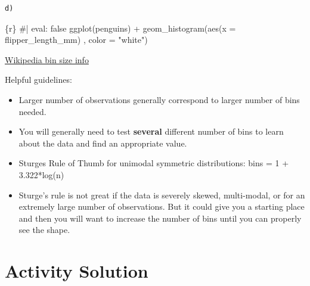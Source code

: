 \documentclass[
  letterpaper,
  DIV=11,
  numbers=noendperiod]{scrreprt}
\newenvironment{Shaded}{\begin{snugshade}}{\end{snugshade}}
\newcommand{\AttributeTok}[1]{\textcolor[rgb]{0.40,0.45,0.13}{#1}}
\newcommand{\CommentTok}[1]{\textcolor[rgb]{0.37,0.37,0.37}{#1}}
\newcommand{\FunctionTok}[1]{\textcolor[rgb]{0.28,0.35,0.67}{#1}}
\newcommand{\InformationTok}[1]{\textcolor[rgb]{0.37,0.37,0.37}{#1}}
\newcommand{\NormalTok}[1]{\textcolor[rgb]{0.00,0.23,0.31}{#1}}
\newcommand{\SpecialCharTok}[1]{\textcolor[rgb]{0.37,0.37,0.37}{#1}}
\newcommand{\StringTok}[1]{\textcolor[rgb]{0.13,0.47,0.30}{#1}}
\begin{document}
\begin{tcolorbox}[enhanced jigsaw, breakable, colback=white, bottomrule=.15mm, leftrule=.75mm, colframe=quarto-callout-note-color-frame, arc=.35mm, rightrule=.15mm, toprule=.15mm, left=2mm, opacityback=0]
\begin{verbatim}
d)  
\end{verbatim}

\begin{Shaded}
\begin{Highlighting}[]
\InformationTok{\textasciigrave{}\textasciigrave{}\textasciigrave{}\{r\}}
\CommentTok{\#| eval: false}
\FunctionTok{ggplot}\NormalTok{(penguins) }\SpecialCharTok{+}
  \FunctionTok{geom\_histogram}\NormalTok{(}\FunctionTok{aes}\NormalTok{(}\AttributeTok{x =}\NormalTok{ flipper\_length\_mm) , }\AttributeTok{color =} \StringTok{"white"}\NormalTok{)}
\InformationTok{\textasciigrave{}\textasciigrave{}\textasciigrave{}}
\end{Highlighting}
\end{Shaded}

\end{tcolorbox}

\begin{tcolorbox}[enhanced jigsaw, breakable, colback=white, bottomrule=.15mm, leftrule=.75mm, colframe=quarto-callout-note-color-frame, arc=.35mm, rightrule=.15mm, toprule=.15mm, left=2mm, opacityback=0]

\href{https://en.wikipedia.org/wiki/Histogram\#Number_of_bins_and_width}{Wikipedia
bin size info}

Helpful guidelines:

\begin{itemize}
\item
  Larger number of observations generally correspond to larger number of
  bins needed.
\item
  You will generally need to test \textbf{several} different number of
  bins to learn about the data and find an appropriate value.
\item
  Sturges Rule of Thumb for unimodal symmetric distributions: bins = 1 +
  3.322*log(n)
\item
  Sturge's rule is not great if the data is severely skewed,
  multi-modal, or for an extremely large number of observations. But it
  could give you a starting place and then you will want to increase the
  number of bins until you can properly see the shape.
\end{itemize}

\end{tcolorbox}

\hypertarget{activity-solution-2}{%
\section*{Activity Solution}\label{activity-solution-2}}
\end{document}
